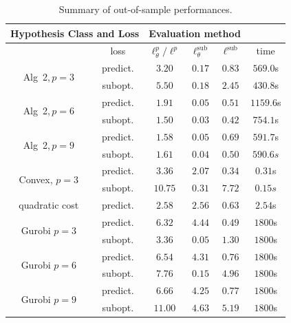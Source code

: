 \documentclass{article}
\theoremstyle{plain}
\begin{document}
\begin{table}[h!]
\vspace{-0.1in}
\caption{Summary of out-of-sample  performances. }\label{tab:multicol}
\begin{center}
\small{
\begin{tabular}{|c|c|c|c|c|c|}
\multicolumn{2}{c}{Hypothesis Class and Loss}& \multicolumn{3}{c}{Evaluation method}\\
    \hline
    & loss & $\ell_\theta^p /\ell^p$ &  $\ell_\theta^\text{sub}$ &  $\ell^{\text{sub}}$ & time \\
    \hline
    \multirow{2}{*}{Alg~2,\,$p=3$}&  predict. &  $3.20$ & $0.17$ & $0.83$ & $569.0$s\\
       \cline{2-6}
       & subopt. & $5.50$  & $0.18$ & $2.45$ & $430.8$s\\

    \hline
    \multirow{2}{*}{Alg~2,\,$p=6$}& predict. &  $1.91$ & $0.05$ & $0.51$ & $1159.6$s \\
       \cline{2-6}
       & subopt. & $1.50$ & $0.03$ & $0.42$ & $754.1$s \\
    \hline
    \multirow{2}{*}{Alg~2,\,$p=9$}& predict. &  $1.58$ & $0.05$ & $0.69$ & $591.7$s \\
    \cline{2-6}
       &subopt. & $1.61$ & $0.04$ & $0.50$ & $590.6s$\\
    \hline
    \hline
    \multirow{2}{*}{Convex, $p=3$}& predict. &  $3.36$ & $2.07$ & $0.34$ & $0.31$s \\
    \cline{2-6}
       &subopt. & $10.75$  & $0.31$ & $7.72$ & $0.15s$\\
    \hline
        \hline
    \multirow{1}{*}{quadratic cost}& predict. &  $2.58$  & $2.56$ & $0.63$ & $2.54$s \\
    \hline
     \hline
    \multirow{2}{*}{Gurobi $p=3$}&  predict.  &  $6.32$ & $4.44$ & $0.49$ & $1800$s\\
       \cline{2-6}
       & subopt. &  $3.36$ & $0.05$ & $1.30$ & $1800$s\\
    \hline
    \multirow{2}{*}{Gurobi $p=6$}& predict. &  $6.54$ & $4.31$ & $0.76$ & $1800$s\\
       \cline{2-6}
       & subopt. &  $7.76$ & $0.15$ & $4.96$ & $1800$s  \\

    \hline
    \multirow{2}{*}{Gurobi $p=9$}& predict. &  $6.66$ & $4.25$ & $0.77$ & $1800$s \\
    \cline{2-6}
       &subopt. & $11.00$ & $4.63$ & $5.19$ & $1800$s\\
    \hline
\end{tabular}}
\vspace{-0.1in}
\end{center}
\end{table}
\end{document}
